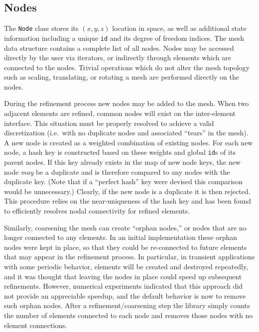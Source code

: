 \subsection{Nodes}
The \texttt{Node} class stores its $(x,y,z)$ location in space, as
well as additional state information including a unique \texttt{id} and its degree
of freedom indices.  The mesh data structure contains a complete list
of all nodes.  Nodes may be accessed directly by the user via
iterators, or indirectly through elements which are connected to the
nodes. Trivial operations which do not alter the mesh topology such as scaling, translating, or rotating a
mesh are performed directly on the nodes.

During the refinement process new nodes may be added to the mesh.
When two adjacent elements are refined, common nodes will exist on the
inter-element interface. This situation must be properly resolved to
achieve a valid discretization (i.e.\ with no duplicate nodes and
associated ``tears'' in the mesh).  A new node is created as a
weighted combination of existing nodes.  For each new node, a hash key
is constructed based on these weights and global \texttt{id}s of its
parent nodes.  If this key already exists in the map of new node keys,
the new node \emph{may} be a duplicate and is therefore compared to
any nodes with the duplicate key. (Note that if a ``perfect hash'' key
were devised this comparison would be unnecessary.)  Clearly, if the
new node is a duplicate it is then rejected. This procedure relies on
the near-uniqueness of the hash key and has been found to efficiently
resolves nodal connectivity for refined elements.

Similarly, coarsening the mesh can create ``orphan nodes,'' or nodes
that are no longer connected to any elements.  In an initial
implementation these orphan nodes were kept in place, so that they
could be re-connected to future elements that may appear in the
refinement process.  In particular, in transient applications with
some periodic behavior, elements will be created and destroyed
repeatedly, and it was thought that leaving the nodes in place could
speed up subsequent refinements.  However, numerical experiments
indicated that this approach did not provide an appreciable speedup,
and the default behavior is now to remove such orphan nodes.  After a
refinement/coarsening step the library simply counts the number of
elements connected to each node and removes those nodes with no
element connections.


